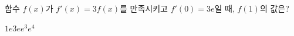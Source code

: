 함수 $f(x)$가 $f'(x)=3f(x)$를 만족시키고 $f'(0)=3e$일 때, $f(1)$의 값은? 
\begin{choices32}{$1$}{$e$}{$3e$}{$e^3$}{$e^4$}\end{choices32}

